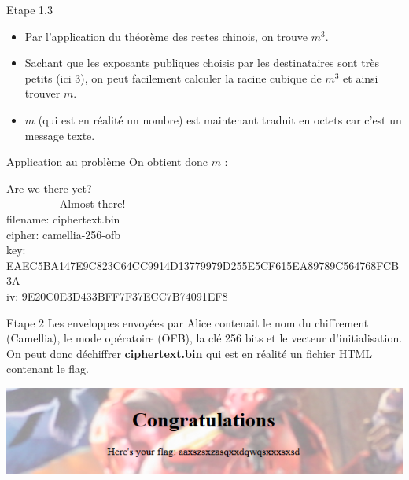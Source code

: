 \documentclass{beamer}
\begin{document}
	\begin{frame}
		\begin{block}{Etape 1.3}
			\begin{itemize}
				\item Par l'application du théorème des restes chinois, on trouve $m^3$.
				\item Sachant que les exposants publiques choisis par les destinataires sont très petits (ici $3$), on peut facilement calculer la racine cubique de $m^3$ et ainsi trouver $m$.
				\item $m$ (qui est en réalité un nombre) est maintenant traduit en octets car c'est un message texte.
			\end{itemize}
		\end{block}
		\begin{exampleblock}{Application au problème}
			On obtient donc $m$ :

			\tiny{Are we there yet?\\
				--------------     Almost there!      -----------------\\
				filename: ciphertext.bin\\
				cipher: camellia-256-ofb\\
				key: EAEC5BA147E9C823C64CC9914D13779979D255E5CF615EA89789C564768FCB3A\\
				iv: 9E20C0E3D433BFF7F37ECC7B74091EF8\\}
		\end{exampleblock}
    \end{frame}

	\begin{frame}
		\begin{block}{Etape 2}
			Les enveloppes envoyées par Alice contenait le nom du chiffrement (Camellia), le mode opératoire (OFB), la clé 256 bits et le vecteur d'initialisation. \newline
			On peut donc déchiffrer \textbf{ciphertext.bin} qui est en réalité un fichier HTML contenant le flag.
		\end{block}
		\begin{center}
		\includegraphics[scale=0.6]{./pictures/110-broadcast-rsa-2.PNG}
		\end{center}
	\end{frame}
\end{document}
